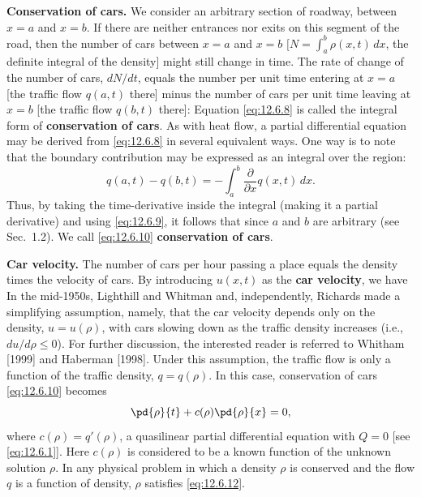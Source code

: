 \textbf{Conservation of cars.}  We consider an arbitrary section of roadway, between $x = a$ and $x = b$.  If there are neither entrances nor exits on this segment of the road, then the number of cars between $x = a$ and $x = b$ $[N = \int_a^b \rho(x,t)\,dx$, the definite integral of the density] might still change in time.  The rate of change of the number of cars, $dN/dt$, equals the number per unit time entering at $x = a$ [the traffic flow $q(a,t)$ there] minus the number of cars per unit time leaving at $x = b$ [the traffic flow $q(b,t)$ there]:
Equation \eqref{eq:12.6.8} is called the integral form of \textbf{conservation of cars}.  As with heat flow, a partial differential equation may be derived from \eqref{eq:12.6.8} in several equivalent ways.  One way is to note that the boundary contribution may be expressed as an integral over the region:
\begin{equation}
\label{eq:12.6.9}
q(a,t) - q(b,t) = -\int_a^b \frac{\partial}{\partial x}q(x,t)\,dx.
\end{equation}
Thus, by taking the time-derivative inside the integral (making it a partial derivative) and using \eqref{eq:12.6.9}, it follows that
since $a$ and $b$ are arbitrary (see Sec.~1.2).  We call \eqref{eq:12.6.10} \textbf{conservation of cars}.

\textbf{Car velocity.}  The number of cars per hour passing a place equals the density times the velocity of cars.  By introducing $u(x,t)$ as the \textbf{car velocity}, we have
In the mid-1950s, Lighthill and Whitman and, independently, Richards made a simplifying assumption, namely, that the car velocity depends only on the density, $u = u(\rho)$, with cars slowing down as the traffic density increases (i.e., $du/d\rho \le 0$).  For further discussion, the interested reader is referred to Whitham [1999] and Haberman [1998].  Under this assumption, the traffic flow is only a function of the traffic density, $q = q(\rho)$.  In this case, conservation of cars \eqref{eq:12.6.10} becomes
\begin{equation}
\label{eq:12.6.12}
\pd{\rho}{t} + c(\rho)\pd{\rho}{x} = 0,
\end{equation}
where $c(\rho) = q'(\rho)$, a quasilinear partial differential equation with $Q = 0$ [see \eqref{eq:12.6.1}].  Here $c(\rho)$ is considered to be a known function of the unknown solution $\rho$.  In any physical problem in which a density $\rho$ is conserved and the flow $q$ is a function of density, $\rho$ satisfies \eqref{eq:12.6.12}.

